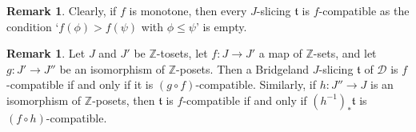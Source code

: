 \documentclass{article}
\theoremstyle{definition}
\newtheorem{rem}[thm]{Remark}
\newcommand{\Z}{\mathbb{Z}}
\newcommand{\tee}{\mathfrak{t}}
\begin{document}
\begin{rem}\label{everything-compatible}
Clearly, if $f$ is monotone, then every $J$-slicing $\tee$ is $f$-compatible as the condition `$f(\phi)>f(\psi)$ with $\phi\leq \psi$' is empty.
\end{rem}

\begin{rem}\label{avanti-e-indietro}
Let $J$ and $J'$ be $\Z$-tosets, let $f\colon J\to J'$ a map of $\Z$-sets, and let $g\colon J'\to J''$ be an isomorphism of $\Z$-posets. Then a Bridgeland $J$-slicing $\tee$ of $\mathscr{D}$ is $f$-compatible if and only if it is $(g\circ f)$-compatible. Similarly, if $h\colon J''\to J$ is an isomorphism of $\Z$-posets, then $\tee$ is $f$-compatible if and only if $(h^{-1})_*\tee$ is $(f\circ h)$-compatible.
\end{rem}
\end{document}
